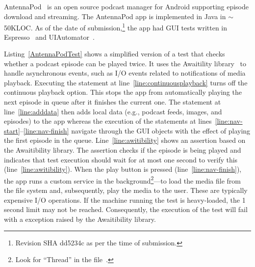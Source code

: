 \documentclass[conference]{IEEEtran}
\begin{document}
\sloppy
AntennaPod~\cite{antennapod} is an open source podcast manager for Android supporting episode download and streaming. 
The AntennaPod app is implemented in Java in $\sim$50KLOC.
As of the date of submission,\footnote{Revision SHA dd5234c as per the time of submission.} the app had \numTestsAntenna{} GUI tests written in Espresso~\cite{espresso-2020} and UIAutomator~\cite{uiautomator-2020}. 

Listing~\ref{AntennaPodTest} shows a simplified version of a test that %
checks whether a podcast episode can be played twice. 
It uses the Awaitility library~\cite{awaitibility} to handle asynchronous events, such as I/O events related to notifications of media playback. Executing the statement at line~\ref{line:continuousplayback} turns off the continuous playback option. This stops the app from automatically playing the next episode in queue after it finishes the current one. The statement at line~\ref{line:adddata} then adds local data (e.g.{}, podcast feeds, images, and episodes) to the app whereas the execution of the statements at lines~\ref{line:nav-start}--\ref{line:nav-finish} navigate through the GUI objects with the effect of playing the first episode in the queue. Line~\ref{line:awitibility} shows an assertion based on the Awaitibility library. The assertion checks if the episode is being played and indicates that test execution should wait for at most one second to verify this (line~\ref{line:awitibility}). 
When the play button is pressed (line~\ref{line:nav-finish}), the app runs a custom service in the background\footnote{Look for ``Thread'' in the  file~\cite{antennapod-playback}.}---to load the media file from the file system and, subsequently, play the media to the user. These are typically expensive I/O operations. If the machine running the test is heavy-loaded, the 1 second limit may not be reached. Consequently, the execution of the test will fail with a   exception raised by the Awaitibility library. 
\end{document}
